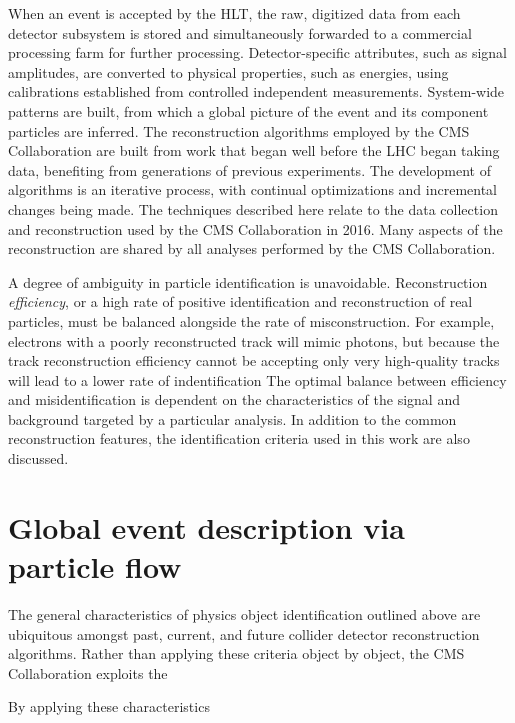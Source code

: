 When an event is accepted by the HLT, the raw, digitized data from each detector
subsystem is stored and simultaneously forwarded to a commercial processing farm for
further processing. Detector-specific attributes, such as signal amplitudes,
are converted to physical properties, such as energies, using calibrations
established from controlled independent measurements. System-wide patterns
are built, from which a global picture of the event and its component particles
are inferred.
The reconstruction algorithms employed by the CMS Collaboration are built from
work that began well before the LHC began taking data, 
benefiting from generations of previous experiments. The development of algorithms
is an iterative process, with continual optimizations and incremental changes
being made. The techniques described here relate to the data collection and reconstruction
used by the CMS Collaboration in 2016. Many aspects of the reconstruction
are shared by all analyses performed by the CMS Collaboration. 

A degree of ambiguity in particle identification is unavoidable. 
Reconstruction \emph{efficiency}, or a high rate of positive identification
and reconstruction of real particles, must be balanced alongside the rate of misconstruction.
For example, electrons with a poorly reconstructed track will mimic photons,
but because the track reconstruction efficiency cannot be 
accepting only very high-quality tracks will lead to a lower rate 
of indentification 
The optimal balance between efficiency and misidentification is dependent
on the characteristics of the signal and background targeted by a particular
analysis. In addition to the common reconstruction features, the identification 
criteria used in this work are also discussed.


\section{Global event description via particle flow}
The general characteristics of physics object identification outlined
above are ubiquitous amongst past, current, and future collider detector
reconstruction algorithms. Rather than applying these criteria object by
object, the CMS Collaboration exploits the 

By applying these characteristics

